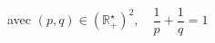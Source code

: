 \documentclass[preview]{standalone}
\begin{document}
\begin{center}
avec \((p, q)\in (\mathbb{R}_{+}^{\star})^2,\quad \dfrac{1}{p} + \dfrac{1}{q} = 1\)
\end{center}
\end{document}
